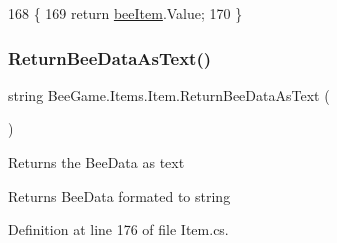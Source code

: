 \begin{DoxyCode}
168         \{
169             \textcolor{keywordflow}{return} \hyperlink{struct_bee_game_1_1_items_1_1_item_a0593f3b7b3ff5daa864f3c6d0ccd77ca}{beeItem}.Value;
170         \}
\end{DoxyCode}
\mbox{\label{struct_bee_game_1_1_items_1_1_item_a1c2f63541269f310381704fc7cc5bc5d}} 
\subsubsection{\texorpdfstring{Return\+Bee\+Data\+As\+Text()}{ReturnBeeDataAsText()}}
{\footnotesize\ttfamily string Bee\+Game.\+Items.\+Item.\+Return\+Bee\+Data\+As\+Text (\begin{DoxyParamCaption}{ }\end{DoxyParamCaption})}



Returns the Bee\+Data as text 

\begin{DoxyReturn}{Returns}
Bee\+Data formated to string
\end{DoxyReturn}


Definition at line 176 of file Item.\+cs.


